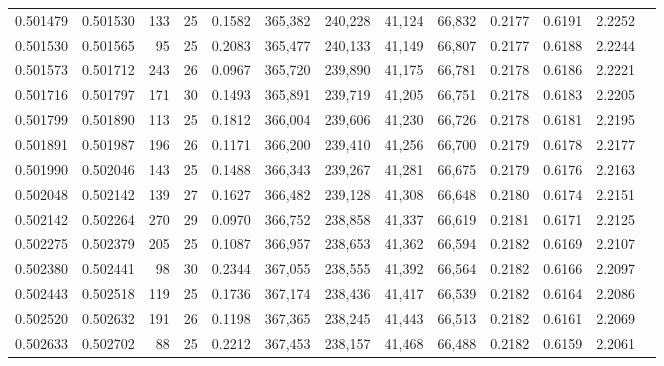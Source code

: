 \begin{tabular}{rrrrrrrrrrrrr}
0.501479 & 0.501530 & 133 &  25 &                                     0.1582 & 365,382 & 240,228 &  41,124 &  66,832 & 0.2177 & 0.6191 & 2.2252 \\
0.501530 & 0.501565 &  95 &  25 &                                     0.2083 & 365,477 & 240,133 &  41,149 &  66,807 & 0.2177 & 0.6188 & 2.2244 \\
0.501573 & 0.501712 & 243 &  26 &                                     0.0967 & 365,720 & 239,890 &  41,175 &  66,781 & 0.2178 & 0.6186 & 2.2221 \\
0.501716 & 0.501797 & 171 &  30 &                                     0.1493 & 365,891 & 239,719 &  41,205 &  66,751 & 0.2178 & 0.6183 & 2.2205 \\
0.501799 & 0.501890 & 113 &  25 &                                     0.1812 & 366,004 & 239,606 &  41,230 &  66,726 & 0.2178 & 0.6181 & 2.2195 \\
0.501891 & 0.501987 & 196 &  26 &                                     0.1171 & 366,200 & 239,410 &  41,256 &  66,700 & 0.2179 & 0.6178 & 2.2177 \\
0.501990 & 0.502046 & 143 &  25 &                                     0.1488 & 366,343 & 239,267 &  41,281 &  66,675 & 0.2179 & 0.6176 & 2.2163 \\
0.502048 & 0.502142 & 139 &  27 &                                     0.1627 & 366,482 & 239,128 &  41,308 &  66,648 & 0.2180 & 0.6174 & 2.2151 \\
0.502142 & 0.502264 & 270 &  29 &                                     0.0970 & 366,752 & 238,858 &  41,337 &  66,619 & 0.2181 & 0.6171 & 2.2125 \\
0.502275 & 0.502379 & 205 &  25 &                                     0.1087 & 366,957 & 238,653 &  41,362 &  66,594 & 0.2182 & 0.6169 & 2.2107 \\
0.502380 & 0.502441 &  98 &  30 &                                     0.2344 & 367,055 & 238,555 &  41,392 &  66,564 & 0.2182 & 0.6166 & 2.2097 \\
0.502443 & 0.502518 & 119 &  25 &                                     0.1736 & 367,174 & 238,436 &  41,417 &  66,539 & 0.2182 & 0.6164 & 2.2086 \\
0.502520 & 0.502632 & 191 &  26 &                                     0.1198 & 367,365 & 238,245 &  41,443 &  66,513 & 0.2182 & 0.6161 & 2.2069 \\
0.502633 & 0.502702 &  88 &  25 &                                     0.2212 & 367,453 & 238,157 &  41,468 &  66,488 & 0.2182 & 0.6159 & 2.2061 \\

\end{tabular}
